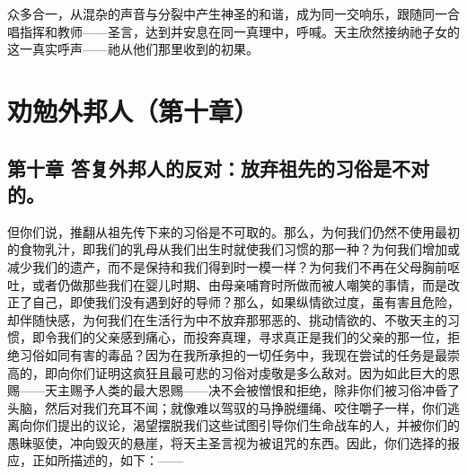 众多合一，从混杂的声音与分裂中产生神圣的和谐，成为同一交响乐，跟随同一合唱指挥和教师——圣言，达到并安息在同一真理中，呼喊。天主欣然接纳祂子女的这一真实呼声——祂从他们那里收到的初果。\par



\section{劝勉外邦人（第十章）}

\par


\subsection{第十章 答复外邦人的反对：放弃祖先的习俗是不对的。}

但你们说，推翻从祖先传下来的习俗是不可取的。那么，为何我们仍然不使用最初的食物乳汁，即我们的乳母从我们出生时就使我们习惯的那一种？为何我们增加或减少我们的遗产，而不是保持和我们得到时一模一样？为何我们不再在父母胸前呕吐，或者仍做那些我们在婴儿时期、由母亲哺育时所做而被人嘲笑的事情，而是改正了自己，即使我们没有遇到好的导师？那么，如果纵情欲过度，虽有害且危险，却伴随快感，为何我们在生活行为中不放弃那邪恶的、挑动情欲的、不敬天主的习惯，即令我们的父亲感到痛心，而投奔真理，寻求真正是我们的父亲的那一位，拒绝习俗如同有害的毒品？因为在我所承担的一切任务中，我现在尝试的任务是最崇高的，即向你们证明这疯狂且最可悲的习俗对虔敬是多么敌对。因为如此巨大的恩赐——天主赐予人类的最大恩赐——决不会被憎恨和拒绝，除非你们被习俗冲昏了头脑，然后对我们充耳不闻；就像难以驾驭的马挣脱缰绳、咬住嚼子一样，你们逃离向你们提出的议论，渴望摆脱我们这些试图引导你们生命战车的人，并被你们的愚昧驱使，冲向毁灭的悬崖，将天主圣言视为被诅咒的东西。因此，你们选择的报应，正如所描述的，如下：——\par

\par

